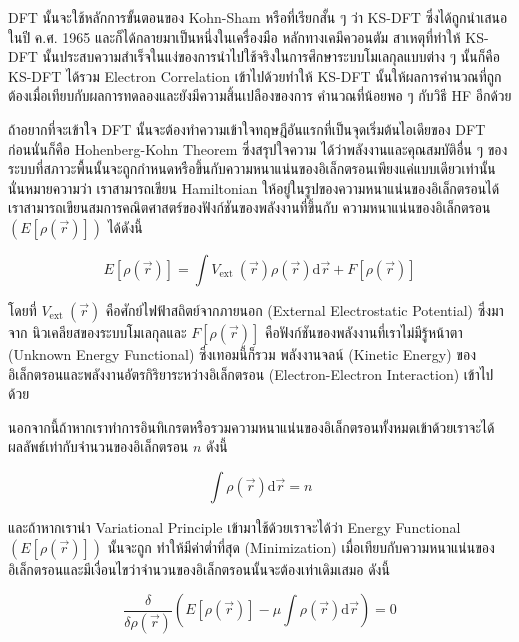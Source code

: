 DFT นั้นจะใช้หลักการขั้นตอนของ Kohn-Sham หรือที่เรียกสั้น ๆ ว่า KS-DFT ซึ่งได้ถูกนำเสนอในปี ค.ศ. 1965 และก็ได้กลายมาเป็นหนึ่งในเครื่องมือ%
หลักทางเคมีควอนตัม สาเหตุที่ทำให้ KS-DFT นั้นประสบความสำเร็จในแง่ของการนำไปใช้จริงในการศึกษาระบบโมเลกุลแบบต่าง ๆ นั้นก็คือ KS-DFT
ได้รวม Electron Correlation เข้าไปด้วยทำให้ KS-DFT นั้นให้ผลการคำนวณที่ถูกต้องเมื่อเทียบกับผลการทดลองและยังมีความสิ้นเปลืองของการ%
คำนวณที่น้อยพอ ๆ กับวิธี HF อีกด้วย

ถ้าอยากที่จะเข้าใจ DFT นั้นจะต้องทำความเข้าใจทฤษฎีอันแรกที่เป็นจุดเริ่มต้นไอเดียของ DFT ก่อนนั่นก็คือ Hohenberg-Kohn Theorem ซึ่งสรุปใจความ%
ได้ว่าพลังงานและคุณสมบัติอื่น ๆ ของระบบที่สภาวะพื้นนั้นจะถูกกำหนดหรือขึ้นกับความหนาแน่นของอิเล็กตรอนเพียงแค่แบบเดียวเท่านั้น นั่นหมายความว่า%
เราสามารถเขียน Hamiltonian ให้อยู่ในรูปของความหนาแน่นของอิเล็กตรอนได้ เราสามารถเขียนสมการคณิตศาสตร์ของฟังก์ชันของพลังงานที่ขึ้นกับ%
ความหนาแน่นของอิเล็กตรอน $(E[\rho(\vec{r})])$ ได้ดังนี้

\begin{equation}
    \label{eq:Energy_Functional_DFT}
    E[\rho(\vec{r})]
    =
    \int V_{\text{ext }}(\vec{r}) \rho(\vec{r}) \mathrm{d} \vec{r}
    + F[\rho(\vec{r})]
\end{equation}

\noindent โดยที่ $V_{\text{ext }}(\vec{r})$ คือศักย์ไฟฟ้าสถิตย์จากภายนอก (External Electrostatic Potential) ซึ่งมาจาก%
นิวเคลียสของระบบโมเลกุลและ $F[\rho(\vec{r})]$ คือฟังก์ชันของพลังงานที่เราไม่มีรู้หน้าตา (Unknown Energy Functional) ซึ่งเทอมนี้ก็รวม%
พลังงานจลน์ (Kinetic Energy) ของอิเล็กตรอนและพลังงานอัตรกิริยาระหว่างอิเล็กตรอน (Electron-Electron Interaction) เข้าไปด้วย

นอกจากนี้ถ้าหากเราทำการอินทิเกรตหรือรวมความหนาแน่นของอิเล็กตรอนทั้งหมดเข้าด้วยเราจะได้ผลลัพธ์เท่ากับจำนวนของอิเล็กตรอน $n$ ดังนี้

\begin{equation}
    \label{eq:Electron_Density_No_Electrons}
    \int \rho(\vec{r}) \mathrm{d} \vec{r}
    =
    n
\end{equation}

\noindent และถ้าหากเรานำ Variational Principle เข้ามาใช้ด้วยเราจะได้ว่า Energy Functional $(E[\rho(\vec{r})])$ นั้นจะถูก%
ทำให้มีค่าต่ำที่สุด (Minimization) เมื่อเทียบกับความหนาแน่นของอิเล็กตรอนและมีเงื่อนไขว่าจำนวนของอิเล็กตรอนนั้นจะต้องเท่าเดิมเสมอ ดังนี้

\begin{equation}
    \label{eq:Energy_Functional_Minized}
    \frac
    {
        \delta
    }
    {
        \delta \rho(\vec{r})
    }
    \left(
    E[\rho(\vec{r})] - \mu \int \rho(\vec{r}) \mathrm{d} \vec{r}
    \right)
    = 0
\end{equation}

